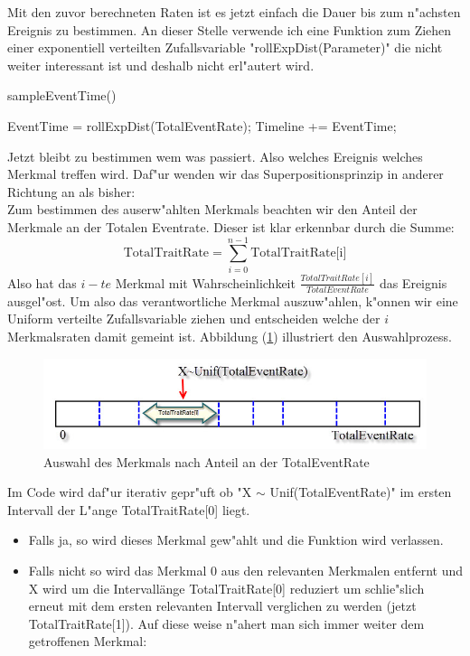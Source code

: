 \documentclass[11pt, a4paper, german]{article}
\theoremstyle{plain}
\begin{document}
	Mit den zuvor berechneten Raten ist es jetzt einfach die Dauer bis zum n"achsten Ereignis zu bestimmen. An dieser Stelle verwende ich eine Funktion zum Ziehen einer exponentiell verteilten Zufallsvariable "{}rollExpDist(Parameter)"{} die nicht weiter interessant ist und deshalb nicht erl"autert wird.
 	\begin{algorithm}[H]
 		\caption{sampleEventTime()}
 		\begin{algorithmic}[1]
 			\State EventTime = rollExpDist(TotalEventRate);
 			\State Timeline += EventTime;
 		\end{algorithmic}
 	\end{algorithm}
 	Jetzt bleibt zu bestimmen wem was passiert. Also welches Ereignis welches Merkmal treffen wird. Daf"ur wenden wir das Superpositionsprinzip in anderer Richtung an als bisher:\\
 	Zum bestimmen des auserw"ahlten Merkmals beachten wir den Anteil der Merkmale an der Totalen Eventrate. Dieser ist klar erkennbar durch die Summe:
 	\[ \text{TotalTraitRate} = \sum_{i = 0}^{n - 1} \text{TotalTraitRate[i]} \]
 	Also hat das $ i-te $ Merkmal mit Wahrscheinlichkeit $ \frac{TotalTraitRate[i]}{TotalEventRate} $ das Ereignis ausgel"ost. Um also das verantwortliche Merkmal auszuw"ahlen, k"onnen wir eine Uniform verteilte Zufallsvariable ziehen und entscheiden welche der $ i $ Merkmalsraten damit gemeint ist. Abbildung (\ref{SelectTrait}) illustriert den Auswahlprozess.
 	\begin{figure}[H]
		\centering
		\includegraphics[width=1\linewidth]{./Pictures/SelectTrait}
		\caption[]{Auswahl des Merkmals nach Anteil an der TotalEventRate}
		\label{SelectTrait}
	\end{figure}
	Im Code wird daf"ur iterativ gepr"uft ob "{}X $ \sim $ Unif(TotalEventRate)"{} im ersten Intervall der L"ange TotalTraitRate[0] liegt. 
	\begin{itemize}
		\item[] Falls ja, so wird dieses Merkmal gew"ahlt und die Funktion wird verlassen.
		\item[] Falls nicht so wird das Merkmal $ 0 $ aus den relevanten Merkmalen entfernt und X wird um die Intervallänge TotalTraitRate[0] reduziert um schlie"slich erneut mit dem ersten relevanten Intervall verglichen zu werden (jetzt TotalTraitRate[1]). Auf diese weise n"ahert man sich immer weiter dem getroffenen Merkmal:
	\end{itemize}
\end{document}
